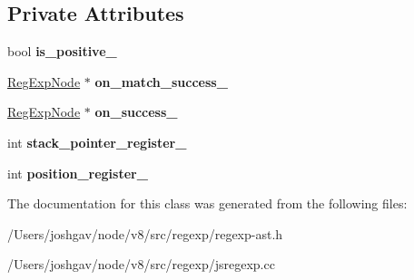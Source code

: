 \subsection*{Private Attributes}
\begin{DoxyCompactItemize}
\item 
bool {\bfseries is\+\_\+positive\+\_\+}\hypertarget{classv8_1_1internal_1_1_reg_exp_lookaround_1_1_builder_a251b69c636482c7a188c795a710124c8}{}\label{classv8_1_1internal_1_1_reg_exp_lookaround_1_1_builder_a251b69c636482c7a188c795a710124c8}

\item 
\hyperlink{classv8_1_1internal_1_1_reg_exp_node}{Reg\+Exp\+Node} $\ast$ {\bfseries on\+\_\+match\+\_\+success\+\_\+}\hypertarget{classv8_1_1internal_1_1_reg_exp_lookaround_1_1_builder_a7f3f53d72e58c26ac3204929731993a6}{}\label{classv8_1_1internal_1_1_reg_exp_lookaround_1_1_builder_a7f3f53d72e58c26ac3204929731993a6}

\item 
\hyperlink{classv8_1_1internal_1_1_reg_exp_node}{Reg\+Exp\+Node} $\ast$ {\bfseries on\+\_\+success\+\_\+}\hypertarget{classv8_1_1internal_1_1_reg_exp_lookaround_1_1_builder_ae8a01881f911a0fe2586c2bf1f116409}{}\label{classv8_1_1internal_1_1_reg_exp_lookaround_1_1_builder_ae8a01881f911a0fe2586c2bf1f116409}

\item 
int {\bfseries stack\+\_\+pointer\+\_\+register\+\_\+}\hypertarget{classv8_1_1internal_1_1_reg_exp_lookaround_1_1_builder_ac97cf34f434e418bfd6540f3b5ad0e56}{}\label{classv8_1_1internal_1_1_reg_exp_lookaround_1_1_builder_ac97cf34f434e418bfd6540f3b5ad0e56}

\item 
int {\bfseries position\+\_\+register\+\_\+}\hypertarget{classv8_1_1internal_1_1_reg_exp_lookaround_1_1_builder_acbd71a61c44be5309c766befe48c26ac}{}\label{classv8_1_1internal_1_1_reg_exp_lookaround_1_1_builder_acbd71a61c44be5309c766befe48c26ac}

\end{DoxyCompactItemize}


The documentation for this class was generated from the following files\+:\begin{DoxyCompactItemize}
\item 
/\+Users/joshgav/node/v8/src/regexp/regexp-\/ast.\+h\item 
/\+Users/joshgav/node/v8/src/regexp/jsregexp.\+cc\end{DoxyCompactItemize}
